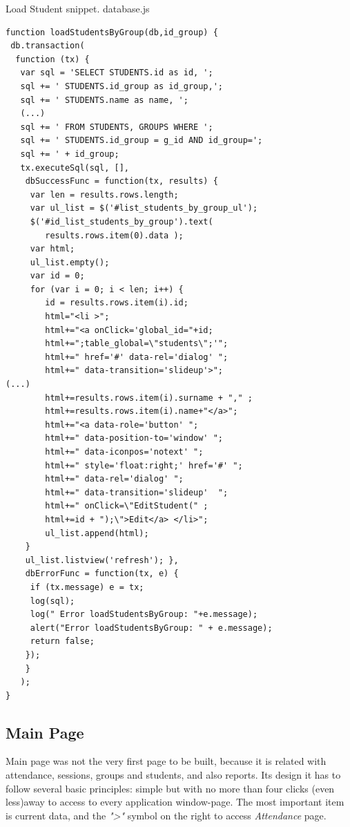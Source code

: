 \newpage


\begin{bclogo}[couleur=blue!30,arrondi=0.1,ombre=true ] 
{Load Student snippet. database.js  \label{load_student_database}}
\begin{verbatim}
function loadStudentsByGroup(db,id_group) {
 db.transaction(
  function (tx) {
   var sql = 'SELECT STUDENTS.id as id, ';
   sql += ' STUDENTS.id_group as id_group,';
   sql += ' STUDENTS.name as name, ';
   (...)
   sql += ' FROM STUDENTS, GROUPS WHERE ';
   sql += ' STUDENTS.id_group = g_id AND id_group=';
   sql += ' + id_group;
   tx.executeSql(sql, [],
    dbSuccessFunc = function(tx, results) {
     var len = results.rows.length;
     var ul_list = $('#list_students_by_group_ul');
     $('#id_list_students_by_group').text(
        results.rows.item(0).data );
     var html;
     ul_list.empty();
     var id = 0;
     for (var i = 0; i < len; i++) {
        id = results.rows.item(i).id;
        html="<li >";
        html+="<a onClick='global_id="+id;
        html+=";table_global=\"students\";'"; 
        html+=" href='#' data-rel='dialog' ";
        html+=" data-transition='slideup'>";
(...)
        html+=results.rows.item(i).surname + "," ;
        html+=results.rows.item(i).name+"</a>";
        html+="<a data-role='button' "; 
        html+=" data-position-to='window' ";
        html+=" data-iconpos='notext' "; 
        html+=" style='float:right;' href='#' ";
        html+=" data-rel='dialog' ";
        html+=" data-transition='slideup'  ";
        html+=" onClick=\"EditStudent(" ;
        html+=id + ");\">Edit</a> </li>";
        ul_list.append(html);
    }
    ul_list.listview('refresh'); },
    dbErrorFunc = function(tx, e) {
     if (tx.message) e = tx;
     log(sql);
     log(" Error loadStudentsByGroup: "+e.message);
     alert("Error loadStudentsByGroup: " + e.message);
     return false;
    });
    }
   );
}
\end{verbatim}
\end{bclogo}

\newpage

\subsection{Main Page}

Main page was not the very first page to be built, because it is related with attendance, sessions, groups and students, and also reports.
Its design it has to follow several basic principles: simple but with no more than four clicks (even less)away to 
 access to every application window-page. The most important item is current data, and the \textit{">" } symbol on the right to access \textit{Attendance} page.
 
